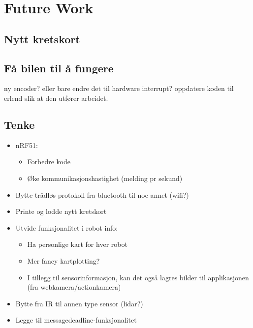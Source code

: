 \chapter{Future Work}
    \section{Nytt kretskort}
    \label{sec:fwSkjold}
    \section{Få bilen til å fungere}
    ny encoder? eller bare endre det til hardware interrupt?
    oppdatere koden til erlend slik at den utfører arbeidet.
    \section{Tenke}
\begin{itemize}
    \item nRF51:
    \begin{itemize}
        \item Forbedre kode
        \item Øke kommunikasjonshastighet (melding pr sekund)
    \end{itemize}
    \item Bytte trådløs protokoll fra bluetooth til noe annet (wifi?)
    \item Printe og lodde nytt kretskort
    \item Utvide funksjonalitet i robot info:
    \begin{itemize}
        \item Ha personlige kart for hver robot
        \item Mer fancy kartplotting?
        \item I tillegg til sensorinformasjon, kan det også lagres bilder til applikasjonen (fra webkamera/actionkamera)
    \end{itemize}
    \item Bytte fra IR til annen type sensor (lidar?)
    \item Legge til messagedeadline-funksjonalitet
\end{itemize}